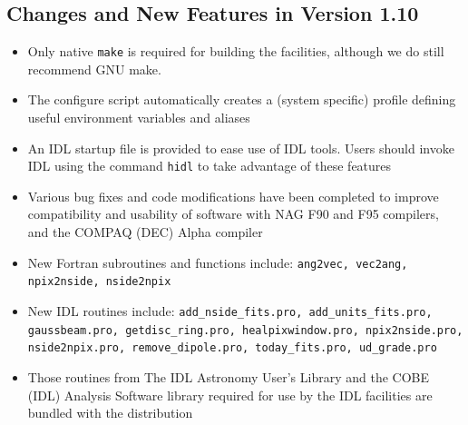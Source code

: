 \documentclass[12pt,twoside]{article}
\begin{document}
{{ \subsection{Changes and New Features in Version 1.10}

 \begin{itemize}
   \item Only native {\tt make} is required for building the
     facilities, although we do still recommend GNU make.
   \item The configure script automatically creates a (system specific)
     profile defining useful environment variables and aliases
   \item An IDL startup file is provided to ease use of IDL tools.
     Users should invoke IDL using the command {\tt hidl} to take
     advantage of these features
   \item Various bug fixes and code modifications have been completed
     to improve compatibility and usability of software with NAG F90
     and F95 compilers, and the COMPAQ (DEC) Alpha compiler
   \item New Fortran subroutines and functions include: \hfill\newline
     {\tt ang2vec, vec2ang, npix2nside, nside2npix}
   \item New IDL routines include: \hfill\newline 
      {\tt add\_nside\_fits.pro, add\_units\_fits.pro, gaussbeam.pro, getdisc\_ring.pro,
      healpixwindow.pro, npix2nside.pro, nside2npix.pro, remove\_dipole.pro, 
      today\_fits.pro, ud\_grade.pro}
   \item Those routines from The IDL Astronomy User's Library and the 
      COBE (IDL) Analysis Software library required for use by
      the \healpix IDL facilities are bundled with the distribution
 \end{itemize}
}}

\vfill\newpage

\normalsize
\end{document}
